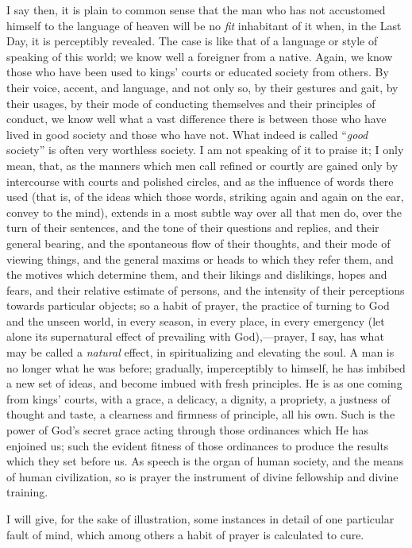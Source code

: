 I say then, it is plain to common sense that the man who has not
accustomed himself to the language of heaven will be no \emph{fit}
inhabitant of it when, in the Last Day, it is perceptibly revealed.
The case is like that of a language or style of speaking of this
world; we know well a foreigner from a native. Again, we know those
who have been used to kings' courts or educated society from others.
By their voice, accent, and language, and not only so, by their
gestures and gait, by their usages, by their mode of conducting
themselves and their principles of conduct, we know well what a vast
difference there is between those who have lived in good society and
those who have not. What indeed is called ``\emph{good}
society'' is often very worthless society. I am not speaking of it
to praise it; I only mean, that, as the manners which men call refined
or courtly are gained only by intercourse with courts and polished
circles, and as the influence of words there used (that is, of the
ideas which those words, striking again and again on the ear, convey
to the mind), extends in a most subtle way over all that men do, over
the turn of their sentences, and the tone of their questions and
replies, and their general bearing, and the spontaneous flow of their
thoughts, and their mode of viewing things, and the general maxims or
heads to which they refer them, and the motives which determine them,
and their likings and dislikings, hopes and fears, and their relative
estimate of persons, and the intensity of their perceptions towards
particular objects; so a habit of prayer, the practice of turning to
God and the unseen world, in every season, in every place, in every
emergency (let alone its supernatural effect of prevailing with God),—prayer,
I say, has what may be called a \emph{natural} effect, in
spiritualizing and elevating the soul. A man is no longer what he was
before; gradually, imperceptibly to himself, he has imbibed a new set
of ideas, and become imbued with fresh principles. He is as one coming
from kings' courts, with a grace, a delicacy, a dignity, a propriety,
a justness of thought and taste, a clearness and firmness of
principle, all his own. Such is the power of God's secret grace acting
through those ordinances which He has enjoined us; such the evident
fitness of those ordinances to produce the results which they set
before us. As speech is the organ of human society, and the means of
human civilization, so is prayer the instrument of divine fellowship
and divine training.

I will give, for the sake of illustration, some instances in detail
of one particular fault of mind, which among others a habit of prayer
is calculated to cure.

